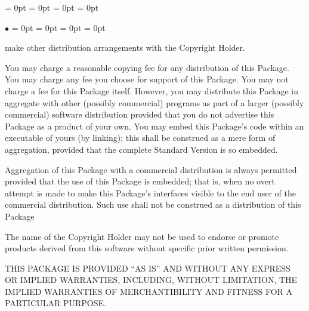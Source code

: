 \documentclass{article}
\newcounter{enumctr}
\newenvironment{enumate}{%
\begin{list}{\arabic{enumctr}}{
\usecounter{enumctr}
\parsep  = 0pt
\parskip = 0pt
\topsep  = 0pt
\itemsep = 0pt
}}{\end{list}}
\newenvironment{itize}%
{\begin{list}%
  {$\bullet$%
  }%
  {\parsep  = 0pt%
   \parskip = 0pt%
   \topsep  = 0pt%
   \itemsep = 0pt%
  }%
}%
{\end{list}%
}
\begin{document}
{\begin{enumate}
\begin{itize}
	\item  make other distribution arrangements with the Copyright Holder.
	\end{itize}
\item  You may charge a reasonable copying fee for any distribution of this Package. You may charge any fee you choose for support of this Package. You may not charge a fee for this Package itself. However, you may distribute this Package in aggregate with other (possibly commercial) programs as part of a larger (possibly commercial) software distribution provided that you do not advertise this Package as a product of your own. You may embed this Package's code within an executable of yours (by linking); this shall be construed as a mere form of aggregation, provided that the complete Standard Version is so embedded.
\item  Aggregation of this Package with a commercial distribution is always permitted provided that the use of this Package is embedded; that is, when no overt attempt is made to make this Package's interfaces visible to the end user of the commercial distribution. Such use shall not be construed as a distribution of this Package
\item  The name of the Copyright Holder may not be used to endorse or promote products derived from this software without specific prior written permission.
\item  THIS PACKAGE IS PROVIDED ``AS IS'' AND WITHOUT ANY EXPRESS OR IMPLIED WARRANTIES, INCLUDING, WITHOUT LIMITATION, THE IMPLIED WARRANTIES OF MERCHANTIBILITY AND FITNESS FOR A PARTICULAR PURPOSE.
\end{enumate}
\end{document}
